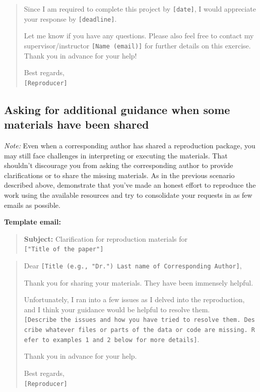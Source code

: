 \documentclass[
  openany]{book}
\begin{document}
\begin{quote}
Since I am required to complete this project by \texttt{{[}date{]}}, I would appreciate your response by \texttt{{[}deadline{]}}.

Let me know if you have any questions. Please also feel free to contact my supervisor/instructor \texttt{{[}Name\ (email){]}} for further details on this exercise. Thank you in advance for your help!

Best regards,\\
\texttt{{[}Reproducer{]}}
\end{quote}

\hypertarget{ask-missing-mat}{%
\subsection{Asking for additional guidance when some materials have been shared}\label{ask-missing-mat}}

\emph{Note:} Even when a corresponding author has shared a reproduction package, you may still face challenges in interpreting or executing the materials. That shouldn't discourage you from asking the corresponding author to provide clarifications or to share the missing materials. As in the previous scenario described above, demonstrate that you've made an honest effort to reproduce the work using the available resources and try to consolidate your requests in as few emails as possible.

\textbf{Template email:}

\begin{quote}
\textbf{Subject:} Clarification for reproduction materials for \texttt{{[}"Title\ of\ the\ paper"{]}}
\end{quote}

\begin{quote}
Dear \texttt{{[}Title\ (e.g.,\ "Dr.")\ Last\ name\ of\ Corresponding\ Author{]}},

Thank you for sharing your materials. They have been immensely helpful.

Unfortunately, I ran into a few issues as I delved into the reproduction, and I think your guidance would be helpful to resolve them. \texttt{{[}Describe\ the\ issues\ and\ how\ you\ have\ tried\ to\ resolve\ them.\ Describe\ whatever\ files\ or\ parts\ of\ the\ data\ or\ code\ are\ missing.\ Refer\ to\ examples\ 1\ and\ 2\ below\ for\ more\ details{]}}.

Thank you in advance for your help.

Best regards,\\
\texttt{{[}Reproducer{]}}
\end{quote}
\end{document}
